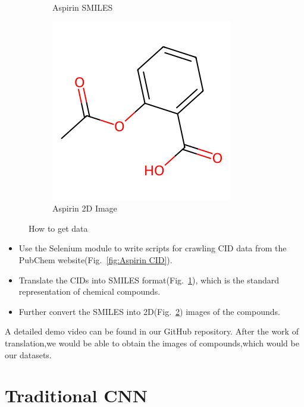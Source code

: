 \documentclass{mcmthesis}
\begin{document}
\begin{figure}[htbp]
\begin{subfigure}{0.3\textwidth}
        \caption{Aspirin SMILES}
        \label{fig:Aspirin SMILES}
    \end{subfigure}
    \hfill
    \begin{subfigure}{0.3\textwidth}
        \includegraphics[width=\linewidth]{pics/aspirin_2d.png}
        \caption{Aspirin 2D Image}
        \label{fig:Aspirin 2D Image}
    \end{subfigure}
    \caption{How to get data}
    \label{fig:How to get data}
\end{figure}
\begin{itemize}
    \item Use the Selenium module to write scripts for crawling CID data from the PubChem website(Fig.~\ref{fig:Aspirin CID}).
    \item Translate the CIDs into SMILES format(Fig.~\ref{fig:Aspirin SMILES}), which is the standard representation of chemical compounds.
    \item Further convert the SMILES into 2D(Fig.~\ref{fig:Aspirin 2D Image}) images of the compounds.
\end{itemize}
A detailed demo video can be found in our GitHub repository.
After the work of translation,we would be able to obtain the images of compounds,which would be our datasets.

\section{Traditional CNN}
\end{document}
